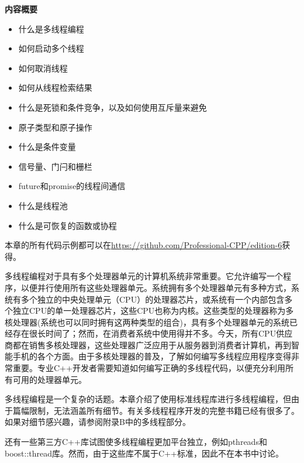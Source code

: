 \noindent
\textbf{内容概要}

\begin{itemize}
\item
什么是多线程编程

\item
如何启动多个线程

\item
如何取消线程

\item
如何从线程检索结果

\item
什么是死锁和条件竞争，以及如何使用互斥量来避免

\item
原子类型和原子操作

\item
什么是条件变量

\item
信号量、门闩和栅栏

\item
future和promise的线程间通信

\item
什么是线程池

\item
什么是可恢复的函数或协程
\end{itemize}

本章的所有代码示例都可以在\url{https://github.com/Professional-CPP/edition-6}获得。

多线程编程对于具有多个处理器单元的计算机系统非常重要。它允许编写一个程序，以便并行使用所有这些处理器单元。系统拥有多个处理器单元有多种方式，系统有多个独立的中央处理单元（CPU）的处理器芯片，或系统有一个内部包含多个独立CPU的单一处理器芯片，这些CPU也称为内核。这些类型的处理器称为多核处理器(系统也可以同时拥有这两种类型的组合)，具有多个处理器单元的系统已经存在很长时间了；然而，在消费者系统中使用得并不多。今天，所有CPU供应商都在销售多核处理器，这些处理器广泛应用于从服务器到消费者计算机，再到智能手机的各个方面。由于多核处理器的普及，了解如何编写多线程应用程序变得非常重要。专业C++开发者需要知道如何编写正确的多线程代码，以便充分利用所有可用的处理器单元。

多线程编程是一个复杂的话题。本章介绍了使用标准线程库进行多线程编程，但由于篇幅限制，无法涵盖所有细节。有关多线程程序开发的完整书籍已经有很多了。如果对细节感兴趣，请参阅附录B中的多线程部分。

还有一些第三方C++库试图使多线程编程更加平台独立，例如pthreads和boost::thread库。然而，由于这些库不属于C++标准，因此不在本书中讨论。






